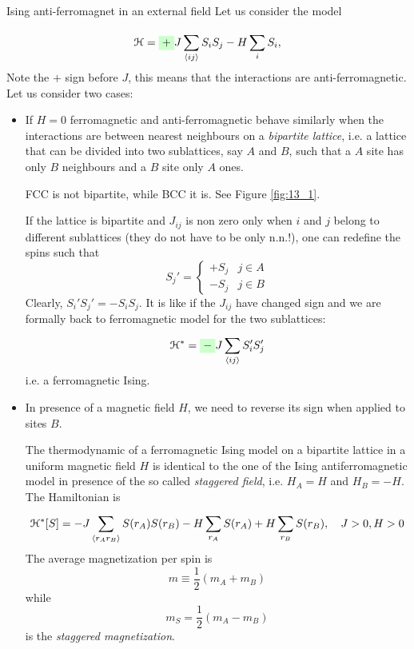 \documentclass[../../Main/Main.tex]{subfiles}
\begin{document}
\begin{example}{Ising anti-ferromagnet in an external field}{}
Let us consider the model

\begin{equation}
  \mathcal{H} = \mathcolorbox{green!20}{+} J \sum_{\expval{ij} }^{} S_i S_j - H \sum_{i}^{} S_i,
\end{equation}
Note the \( + \) sign before \( J \), this means that the interactions are anti-ferromagnetic. Let us consider two cases:
\begin{itemize}
\item  If \( H=0 \) ferromagnetic and anti-ferromagnetic behave similarly when the interactions are between nearest neighbours on a \emph{bipartite lattice}, i.e. a lattice that can be divided into two sublattices, say \( A \) and \( B \), such that a \( A \) site has only \( B \) neighbours and a \( B \) site only \( A \) ones.
\begin{remark}
FCC is not bipartite, while BCC it is. See Figure \ref{fig:13_1}.
\end{remark}

If the lattice is bipartite and \( J_{ij} \) is non zero only when \( i \) and \( j \) belong to different sublattices (they do not have to be only n.n.!), one can redefine the spins such that
\begin{equation*}
  S_j' = \begin{cases}
    + S_j & j \in A \\
    - S_j & j \in B
\end{cases}
\end{equation*}
Clearly, \( S_i'S_j' = - S_i S_j \). It is like if the \( J_{ij} \) have changed sign and we are formally back to ferromagnetic model for the two sublattices:
\begin{equation}
  \mathcal{H}^{*} = \mathcolorbox{green!20}{-} J \sum_{\expval{ij} }^{} S_i' S_j'
\end{equation}
i.e. a ferromagnetic Ising.

\item In presence of a magnetic field \( H \), we need to reverse its sign when applied to sites \( B \).

The thermodynamic of a ferromagnetic Ising model on a bipartite lattice in a uniform magnetic field \( H \) is identical to the one of the Ising antiferromagnetic model in presence of the so called \emph{staggered field}, i.e. \( H_A = H \) and \( H_B = -H \).
The Hamiltonian is 
\begin{equation}
  \mathcal{H}^* [S] = -J \sum_{\expval{r_A r_B} }^{} S(r_A) S(r_B) - H \sum_{r_A}^{} S(r_A) + H \sum_{r_B}^{} S(r_B), \quad J>0, H>0
\end{equation}
The average magnetization per spin is
\begin{equation*}
  m \equiv \frac{1}{2}(m_A+m_B)
\end{equation*}
  while
  \begin{equation*}
    m_S = \frac{1}{2}(m_A-m_B)
  \end{equation*}
  is the \emph{staggered magnetization}.


\end{itemize}
\end{example}
\end{document}
